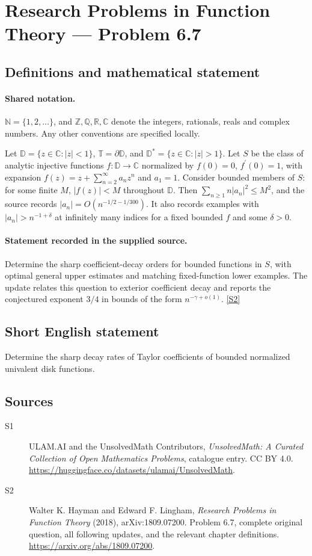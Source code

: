 \documentclass[11pt]{book}
\newcommand{\sref}[2]{\hyperlink{source:#1:#2}{[S#2]}}
\begin{document}
\section{Research Problems in Function Theory — Problem 6.7}\label{statement}

\subsection{Definitions and mathematical statement}

\paragraph{Shared notation.}$\mathbb N=\{1,2,\ldots\}$, and $\mathbb Z,\mathbb Q,\mathbb R,\mathbb C$ denote the integers, rationals, reals and complex numbers. Any other conventions are specified locally.


Let $\mathbb D=\{z\in\mathbb C:|z|<1\}$, $\mathbb T=\partial\mathbb D$, and $\mathbb D^*=\{z\in\mathbb C:|z|>1\}$. Let $S$ be the class of analytic injective functions $f:\mathbb D\to\mathbb C$ normalized by $f(0)=0$, $f^{\prime}(0)=1$, with expansion $f(z)=z+\sum_{n=2}^{\infty}a_nz^n$ and $a_1=1$. Consider bounded members of $S$: for some finite $M$, $|f(z)|<M$ throughout $\mathbb D$. Then $\sum_{n\ge1}n|a_n|^2\le M^2$, and the source records $|a_n|=O(n^{-1/2-1/300})$. It also records examples with $|a_n|>n^{-1+\delta}$ at infinitely many indices for a fixed bounded $f$ and some $\delta>0$.
\paragraph{Statement recorded in the supplied source.}
Determine the sharp coefficient-decay orders for bounded functions in $S$, with optimal general upper estimates and matching fixed-function lower examples. The update relates this question to exterior coefficient decay and reports the conjectured exponent $3/4$ in bounds of the form $n^{-\gamma+o(1)}$. \sref{statement}{2}
\subsection{Short English statement}
Determine the sharp decay rates of Taylor coefficients of bounded normalized univalent disk functions.
\subsection{Sources}
\begin{description}
\item[\hypertarget{source:statement:1}{S1}] ULAM.AI and the UnsolvedMath Contributors, \emph{UnsolvedMath: A Curated Collection of Open Mathematics Problems}, catalogue entry. CC BY 4.0. \url{https://huggingface.co/datasets/ulamai/UnsolvedMath}.
\item[\hypertarget{source:statement:2}{S2}] Walter K. Hayman and Edward F. Lingham, \emph{Research Problems in Function Theory} (2018), arXiv:1809.07200. Problem 6.7, complete original question, all following updates, and the relevant chapter definitions. \url{https://arxiv.org/abs/1809.07200}.
\end{description}
\label{end:statement}
\end{document}
